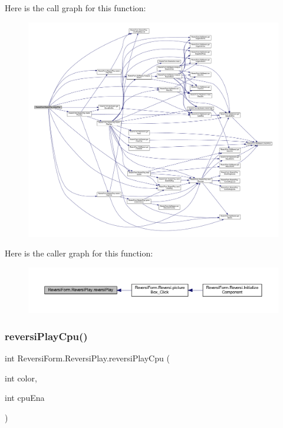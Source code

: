 Here is the call graph for this function\+:\nopagebreak
\begin{figure}[H]
\begin{center}
\leavevmode
\includegraphics[width=350pt]{class_reversi_form_1_1_reversi_play_a7f3822227e59fac0f998927a6566006e_cgraph}
\end{center}
\end{figure}
Here is the caller graph for this function\+:\nopagebreak
\begin{figure}[H]
\begin{center}
\leavevmode
\includegraphics[width=350pt]{class_reversi_form_1_1_reversi_play_a7f3822227e59fac0f998927a6566006e_icgraph}
\end{center}
\end{figure}
\mbox{\label{class_reversi_form_1_1_reversi_play_abec0ea86adfc0d2f960af71235eea016}} 
\subsubsection{\texorpdfstring{reversi\+Play\+Cpu()}{reversiPlayCpu()}}
{\footnotesize\ttfamily int Reversi\+Form.\+Reversi\+Play.\+reversi\+Play\+Cpu (\begin{DoxyParamCaption}\item[{int}]{color,  }\item[{int}]{cpu\+Ena }\end{DoxyParamCaption})}



